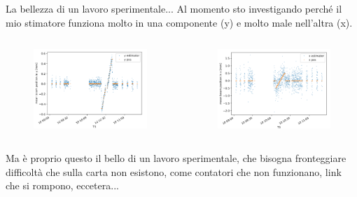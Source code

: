 \documentclass[
10pt,
aspectratio=169,
]{beamer}
\begin{document}
\begin{frame}{La bellezza di un lavoro sperimentale...}
Al momento sto investigando perché il mio stimatore funziona molto in una componente (y) e molto male nell'altra (x).
\vspace{-0.2cm}
    \begin{columns}
        \begin{figure}
            \centering
            \includegraphics[width=\textwidth]{figures/y_estimator.png}
        \end{figure}
        \begin{figure}
            \centering
            \includegraphics[width=\textwidth]{figures/x_estimator.png}
        \end{figure}
    \end{columns}
    \vfill
    Ma è proprio questo il bello di un lavoro sperimentale, che bisogna fronteggiare difficoltà che sulla carta non esistono, come contatori che non funzionano, link che si rompono, eccetera...
\end{frame}
\end{document}
